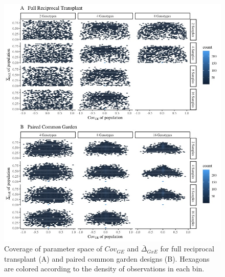 \documentclass[11pt, oneside]{amsart}
\begin{document}
\renewcommand\thefigure{S1}
\begin{figure}[h]
\begin{center}
\includegraphics[width=6in]{Figs/HexPlot.jpeg}
\end{center}
\label{Fig: Parameter Coverage}
\caption[Coverage of parameter space of $Cov_{GE}$ and $\bar\Delta_{GxE}$ for full reciprocal transplant (A) and paired common garden designs (B).]{Coverage of parameter space of $Cov_{GE}$ and $\bar\Delta_{GxE}$ for full reciprocal transplant (A) and paired common garden designs (B). Hexagons are colored according to the density of observations in each bin. }
\end{figure}

\clearpage
\newpage
\end{document}
